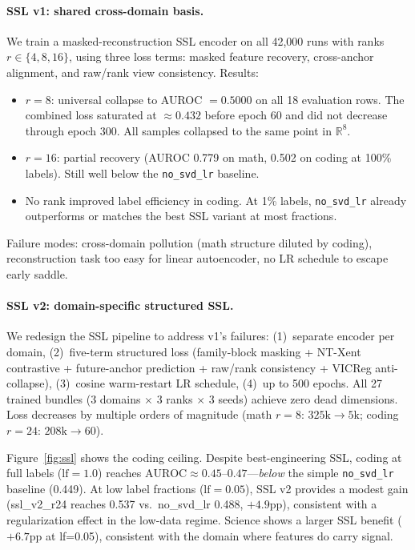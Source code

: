 \documentclass[10pt,twocolumn]{article}
\begin{document}
\paragraph{SSL v1: shared cross-domain basis.} We train a masked-reconstruction SSL encoder on all 42,000 runs with ranks $r \in \{4, 8, 16\}$, using three loss terms: masked feature recovery, cross-anchor alignment, and raw/rank view consistency. Results:

\begin{itemize}
  \setlength\itemsep{0.15em}
  \item $r=8$: universal collapse to AUROC $= 0.5000$ on all 18 evaluation rows. The combined loss saturated at $\approx 0.432$ before epoch 60 and did not decrease through epoch 300. All samples collapsed to the same point in $\mathbb{R}^8$.
  \item $r=16$: partial recovery (AUROC 0.779 on math, 0.502 on coding at 100\% labels). Still well below the \texttt{no\_svd\_lr} baseline.
  \item No rank improved label efficiency in coding. At 1\% labels, \texttt{no\_svd\_lr} already outperforms or matches the best SSL variant at most fractions.
\end{itemize}

Failure modes: cross-domain pollution (math structure diluted by coding), reconstruction task too easy for linear autoencoder, no LR schedule to escape early saddle.

\paragraph{SSL v2: domain-specific structured SSL.} We redesign the SSL pipeline to address v1's failures: (1)~separate encoder per domain, (2)~five-term structured loss (family-block masking + NT-Xent contrastive + future-anchor prediction + raw/rank consistency + VICReg anti-collapse), (3)~cosine warm-restart LR schedule, (4)~up to 500 epochs. All 27 trained bundles (3 domains $\times$ 3 ranks $\times$ 3 seeds) achieve zero dead dimensions. Loss decreases by multiple orders of magnitude (math $r=8$: $325\text{k} \to 5\text{k}$; coding $r=24$: $208\text{k} \to 60$).

Figure~\ref{fig:ssl} shows the coding ceiling. Despite best-engineering SSL, coding at full labels ($\text{lf}=1.0$) reaches $\text{AUROC} \approx 0.45$--$0.47$---\emph{below} the simple \texttt{no\_svd\_lr} baseline (0.449). At low label fractions ($\text{lf}=0.05$), SSL v2 provides a modest gain (ssl\_v2\_r24 reaches 0.537 vs.\ no\_svd\_lr 0.488, $+4.9\text{pp}$), consistent with a regularization effect in the low-data regime. Science shows a larger SSL benefit ($+6.7\text{pp}$ at lf=0.05), consistent with the domain where features do carry signal.
\end{document}
